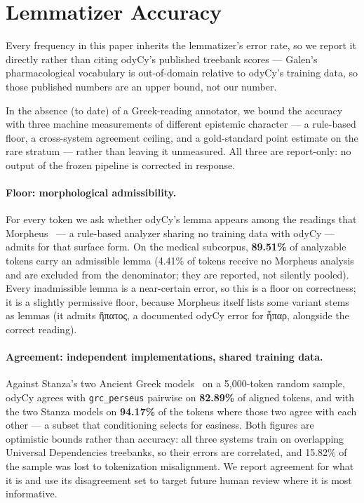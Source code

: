 \documentclass[11pt]{article}
\begin{document}
\section{Lemmatizer Accuracy}
\label{sec:accuracy}

Every frequency in this paper inherits the lemmatizer's error rate, so we report it directly rather
than citing odyCy's published treebank scores --- Galen's pharmacological vocabulary is out-of-domain
relative to odyCy's training data, so those published numbers are an upper bound, not our number.

In the absence (to date) of a Greek-reading annotator, we bound the accuracy with three machine
measurements of different epistemic character --- a rule-based floor, a cross-system agreement
ceiling, and a gold-standard point estimate on the rare stratum --- rather than leaving it
unmeasured. All three are report-only: no output of the frozen pipeline is corrected in response.

\paragraph{Floor: morphological admissibility.}
For every token we ask whether odyCy's lemma appears among the readings that
Morpheus~\citep{crane-1991-morpheus} --- a rule-based analyzer sharing no training data with odyCy ---
admits for that surface form. On the medical subcorpus, \textbf{89.51\%} of analyzable tokens carry
an admissible lemma (4.41\% of tokens receive no Morpheus analysis and are excluded from the
denominator; they are reported, not silently pooled). Every inadmissible lemma is a near-certain
error, so this is a floor on correctness; it is a slightly permissive floor, because Morpheus itself
lists some variant stems as lemmas (it admits ἥπατος, a documented odyCy error for ἧπαρ, alongside
the correct reading).

\paragraph{Agreement: independent implementations, shared training data.}
Against Stanza's two Ancient Greek models~\citep{qi-etal-2020-stanza} on a 5{,}000-token random
sample, odyCy agrees with \texttt{grc\_perseus} pairwise on \textbf{82.89\%} of aligned tokens, and
with the two Stanza models on \textbf{94.17\%} of the tokens where those two agree with each other
--- a subset that conditioning selects for easiness. Both figures are optimistic bounds rather than
accuracy: all three systems train on overlapping Universal Dependencies treebanks, so their errors
are correlated, and 15.82\% of the sample was lost to tokenization misalignment. We report agreement
for what it is and use its disagreement set to target future human review where it is most
informative.
\end{document}
